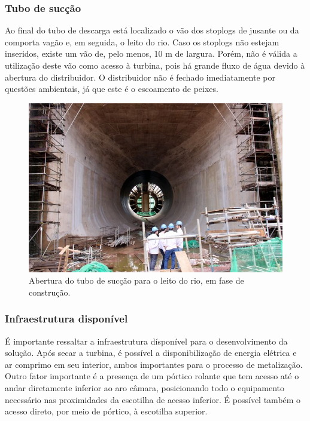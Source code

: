 \subsubsection{Tubo de sucção}

Ao final do tubo de descarga está localizado o vão dos stoplogs 
de jusante ou da comporta vagão e, em seguida, o leito do rio. Caso os stoplogs 
não estejam inseridos, existe um vão de, pelo menos, 10 m de largura. Porém, não
é válida a utilização deste vão como acesso à turbina, pois há grande fluxo de
água devido à abertura do distribuidor. O distribuidor não é fechado
imediatamente por questões ambientais, já que este é o escoamento de peixes.


\begin{figure}[H]	
	\includegraphics[width=\columnwidth]{sota/figs/viagem/img_5086}
	\caption{Abertura do tubo de sucção para o leito do rio, em fase de
	construção.}
	\label{fig::tubo_suc}
\end{figure}

\subsubsection{Infraestrutura disponível}
É importante ressaltar a infraestrutura dísponível para o desenvolvimento da solução. 
Após secar a turbina, é possível a disponibilização de energia elétrica e ar
comprimo em seu interior, ambos importantes para o processo de metalização. Outro fator 
importante é a presença de um pórtico rolante que tem acesso até o andar diretamente 
inferior ao aro câmara, posicionando todo o equipamento necessário nas proximidades 
da escotilha de acesso inferior. É possível também o acesso direto, por meio de pórtico, 
à escotilha superior.

